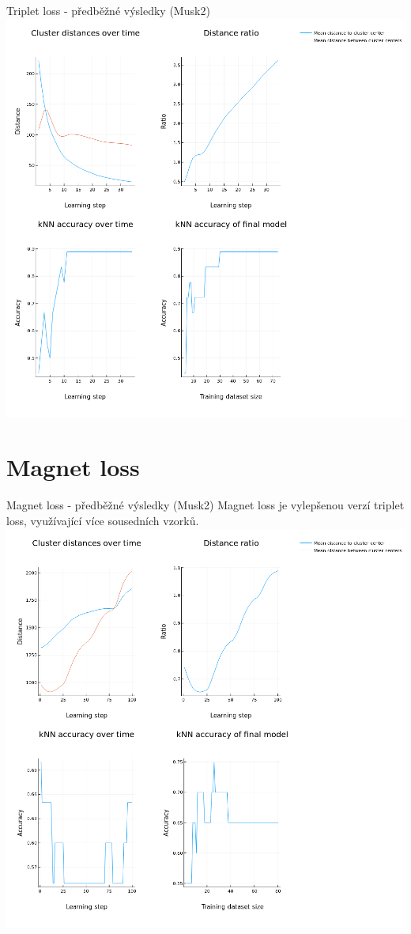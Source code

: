 \documentclass[10pt]{beamer}
\begin{document}
\begin{frame}{Triplet loss - předběžné výsledky (Musk2)}
	\centering
	\includegraphics[width=0.7\pagewidth]{images/triplet.png}
\end{frame}

\section{Magnet loss}

\begin{frame}{Magnet loss - předběžné výsledky (Musk2)}
	Magnet loss je vylepšenou verzí triplet loss, využívající více sousedních vzorků.
	\centering
	\includegraphics[width=0.65\pagewidth]{images/magnet.png}
\end{frame}
\end{document}
